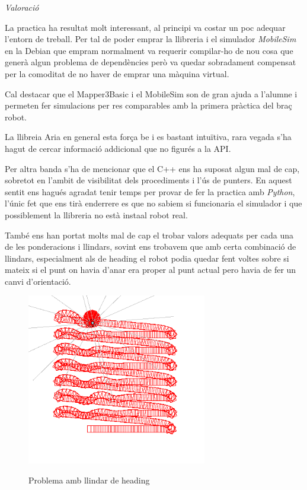 \emph{Valoració}

La practica ha resultat molt interessant, al principi va costar un poc adequar l'entorn de treball.
Per tal de poder emprar la llibreria i el simulador \emph{MobileSim} en la Debian que empram normalment
va requerir compilar-ho de nou cosa que generà algun problema de dependències però va quedar sobradament
compensat per la comoditat de no haver de emprar una màquina virtual.

Cal destacar que el Mapper3Basic i el MobileSim son de gran ajuda a l'alumne i permeten fer simulacions
per res comparables amb la primera pràctica del braç robot.

La llibreia Aria en general esta força be i es bastant intuïtiva, rara vegada s'ha hagut de cercar
informació addicional que no figurés a la API.

Per altra banda s'ha de mencionar que el C++ ens ha suposat algun mal de cap, sobretot en l'ambit
de visibilitat dels procediments i l'ús de punters. En aquest sentit ens hagués agradat tenir temps
per provar de fer la practica amb \emph{Python}, l'únic fet que ens tirà enderrere es que no sabiem si funcionaria
el simulador i que possiblement la llibreria no està insta\lgem al robot real.

També ens han portat molts mal de cap el trobar valors adequats per cada una de les ponderacions i llindars,
sovint ens trobavem que amb certa combinació de llindars, especialment als de heading el robot podia quedar
fent voltes sobre si mateix si el punt on havia d'anar era proper al punt actual pero havia de fer un canvi
d'orientació.

\begin{figure}[H]
\begin{center}\label{headingthproblem}
 \includegraphics[width=0.7\textwidth]{diagrames/figures/voltes.png}
\end{center}
  \caption{Problema amb llindar de heading}
\end{figure}

